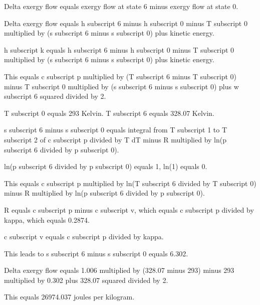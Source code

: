 Delta exergy flow equals exergy flow at state 6 minus exergy flow at state 0.  

Delta exergy flow equals h subscript 6 minus h subscript 0 minus T subscript 0 multiplied by (s subscript 6 minus s subscript 0) plus kinetic energy.  

h subscript k equals h subscript 6 minus h subscript 0 minus T subscript 0 multiplied by (s subscript 6 minus s subscript 0) plus kinetic energy.  

This equals c subscript p multiplied by (T subscript 6 minus T subscript 0) minus T subscript 0 multiplied by (s subscript 6 minus s subscript 0) plus w subscript 6 squared divided by 2.  

T subscript 0 equals 293 Kelvin.  
T subscript 6 equals 328.07 Kelvin.  

s subscript 6 minus s subscript 0 equals integral from T subscript 1 to T subscript 2 of c subscript p divided by T dT minus R multiplied by ln(p subscript 6 divided by p subscript 0).  

ln(p subscript 6 divided by p subscript 0) equals 1, ln(1) equals 0.  

This equals c subscript p multiplied by ln(T subscript 6 divided by T subscript 0) minus R multiplied by ln(p subscript 6 divided by p subscript 0).  

R equals c subscript p minus c subscript v, which equals c subscript p divided by kappa, which equals 0.2874.  

c subscript v equals c subscript p divided by kappa.  

This leads to s subscript 6 minus s subscript 0 equals 6.302.  

Delta exergy flow equals 1.006 multiplied by (328.07 minus 293) minus 293 multiplied by 0.302 plus 328.07 squared divided by 2.  

This equals 26974.037 joules per kilogram.